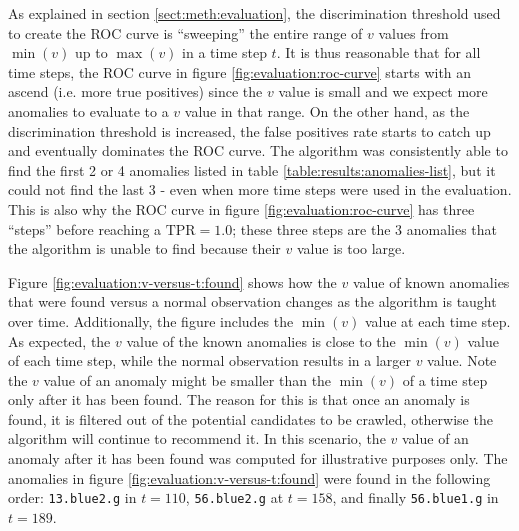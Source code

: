 As explained in section \ref{sect:meth:evaluation}, the discrimination threshold used to create the ROC curve is ``sweeping'' the entire range of $v$ values from $\min(v)$ up to $\max(v)$ in a time step $t$. It is thus reasonable that for all time steps, the ROC curve in figure \ref{fig:evaluation:roc-curve} starts with an ascend (i.e. more true positives) since the $v$ value is small and we expect more anomalies to evaluate to a $v$ value in that range. On the other hand, as the discrimination threshold is increased, the false positives rate starts to catch up and eventually dominates the ROC curve. The \mlblink algorithm was consistently able to find the first 2 or 4 anomalies listed in table \ref{table:results:anomalies-list}, but it could not find the last 3 - even when more time steps were used in the evaluation. This is also why the ROC curve in figure \ref{fig:evaluation:roc-curve} has three ``steps'' before reaching a $\text{TPR} = 1.0$; these three steps are the 3 anomalies that the \mlblink algorithm is unable to find because their $v$ value is too large. \newline

Figure \ref{fig:evaluation:v-versus-t:found} shows how the $v$ value of known anomalies that were found versus a normal observation changes as the \mlblink algorithm is taught over time. Additionally, the figure includes the $\min(v)$ value at each time step. As expected, the $v$ value of the known anomalies is close to the $\min(v)$ value of each time step, while the normal observation results in a larger $v$ value. Note the $v$ value of an anomaly might be smaller than the $\min(v)$ of a time step only after it has been found. The reason for this is that once an anomaly is found, it is filtered out of the potential candidates to be crawled, otherwise the \mlblink algorithm will continue to recommend it. In this scenario, the $v$ value of an anomaly after it has been found was computed for illustrative purposes only. The anomalies in figure \ref{fig:evaluation:v-versus-t:found} were found in the following order: \texttt{13.blue2.g} in $t = 110$, \texttt{56.blue2.g} at $t = 158$, and finally \texttt{56.blue1.g} in $t = 189$. \newline


